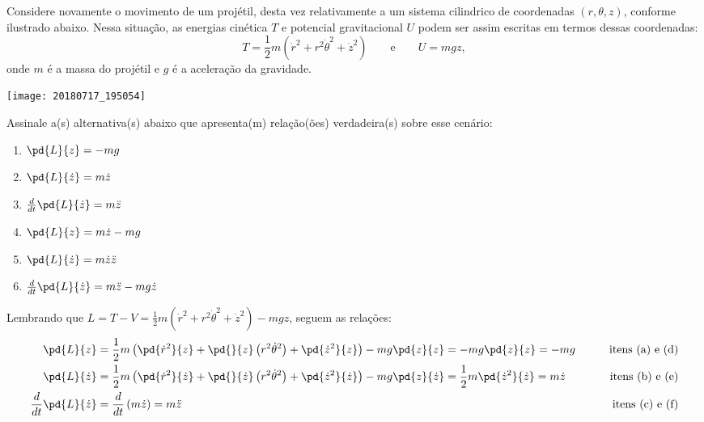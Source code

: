 \begin{question}
    Considere novamente o movimento de um projétil, desta vez relativamente a um sistema cilindrico de coordenadas $(r,\theta,z)$, conforme ilustrado abaixo.
    Nessa situação, as energias cinética $T$ e potencial gravitacional $U$ podem ser assim escritas em termos dessas coordenadas:
    \begin{equation*}
      T = \frac{1}{2}m\left(\dot r^2 + r^2 \dot\theta^2 + \dot z^2\right) \qquad\text{e}\qquad
      U = mgz,
    \end{equation*}
    onde $m$ é a massa do projétil e $g$ é a aceleração da gravidade.

    \begin{center}
      \texttt{[image: 20180717\_195054]}
    \end{center}

    Assinale a(s) alternativa(s) abaixo que apresenta(m) relação(ões) verdadeira(s) sobre esse cenário:
    \begin{enumerate}
      \item $\pd{L}{z} = -mg$ \rightanswer
      \item $\pd{L}{\dot z} = m\dot z$ \rightanswer
      \item $\frac{d}{dt}\pd{L}{\dot z} = m\ddot z$ \rightanswer
      \item $\pd{L}{z} = m\dot z - mg$
      \item $\pd{L}{\dot z} = m\dot z \ddot z$
      \item $\frac{d}{dt}\pd{L}{\dot z} = m\ddot z - mg\dot z$
    \end{enumerate}

    \begin{solution}
      Lembrando que $L = T - V = \frac{1}{2}m\left(\dot r^2 + r^2 \dot\theta^2 + \dot z^2\right) - mgz$, seguem as relações:
      \begin{align*}
        \pd{L}{z} &= \frac{1}{2}m\left(\pd{\dot r^2}{z} + \pd{}{z}\left(r^2 \dot\theta^2\right) + \pd{\dot z^2}{z}\right) - mg\pd{z}{z}
            = - mg\pd{z}{z} = -mg \qquad &\text{itens (a) e (d)} \\
        \pd{L}{\dot z} &= \frac{1}{2}m\left(\pd{\dot r^2}{\dot z} + \pd{}{\dot z}\left(r^2 \dot\theta^2\right) + \pd{\dot z^2}{\dot z}\right) - mg\pd{z}{\dot z} = \frac{1}{2}m \pd{\dot z^2}{\dot z} = m\dot z \qquad &\text{itens (b) e (e)} \\
        \frac{d}{dt}\pd{L}{\dot z} &= \frac{d}{dt}\left(m\dot z\right) = m\ddot z \qquad &\text{itens (c) e (f)}
      \end{align*}
    \end{solution}
\end{question}